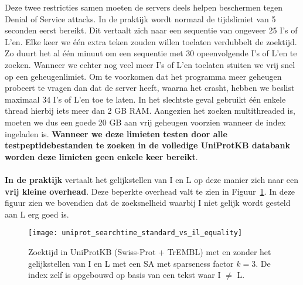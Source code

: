 Deze twee restricties samen moeten de servers deels helpen beschermen tegen Denial of Service attacks.
In de praktijk wordt normaal de tijdslimiet van 5 seconden eerst bereikt.
Dit vertaalt zich naar een sequentie van ongeveer 25 I's of L'en.
Elke keer we één extra teken zouden willen toelaten verdubbelt de zoektijd.
Zo duurt het al één minuut om een sequentie met 30 opeenvolgende I's of L'en te zoeken.
Wanneer we echter nog veel meer I's of L'en toelaten stuiten we vrij snel op een geheugenlimiet.
Om te voorkomen dat het programma meer geheugen probeert te vragen dan dat de server heeft, waarna het crasht, hebben we beslist maximaal 34 I's of L'en toe te laten.
In het slechtste geval gebruikt één enkele thread hierbij iets meer dan 2 GB RAM\@.
Aangezien het zoeken multithreaded is, moeten we dus een goede 20 GB aan vrij geheugen voorzien wanneer de index ingeladen is.
\textbf{Wanneer we deze limieten testen door alle testpeptidebestanden te zoeken in de volledige UniProtKB databank worden deze limieten geen enkele keer bereikt}.
\\ \\
\textbf{In de praktijk} vertaalt het gelijkstellen van I en L op deze manier zich naar een \textbf{vrij kleine overhead}.
Deze beperkte overhead valt te zien in Figuur~\ref{fig:uniprot_search}.
In deze figuur zien we bovendien dat de zoeksnelheid waarbij I niet gelijk wordt gesteld aan L erg goed is.

\begin{figure}[ht]
    \centering
    \texttt{[image: uniprot\_searchtime\_standard\_vs\_il\_equality]}
    \caption{Zoektijd in UniProtKB (Swiss-Prot + TrEMBL) met en zonder het gelijkstellen van I en L met een SA met sparseness factor $k = 3$. De index zelf is opgebouwd op basis van een tekst waar I $\neq$ L.}
    \label{fig:uniprot_search}
\end{figure}


